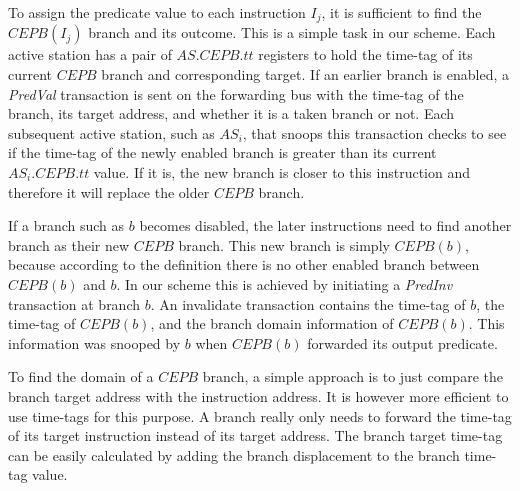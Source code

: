 \documentclass[10pt,twocolumn]{IEEEtran}
\begin{document}
To assign the predicate value to each instruction $I_j$, it is sufficient
to find the $CEPB(I_j)$ branch and its outcome.  This is a simple
task in our scheme.  Each active station has a pair of $AS.CEPB.tt$
registers to hold the time-tag of its current $CEPB$ branch and
corresponding target.  If an earlier branch is enabled, a
\emph{PredVal} transaction is sent on the forwarding bus with
the time-tag of the branch, its target address, and whether it is a taken
branch or not.  Each subsequent active station, such as $AS_i$,
that snoops this
transaction checks to see if the time-tag of the newly enabled
branch is greater than its current $AS_i.CEPB.tt$ value. 
If it is, the new
branch is closer to this instruction and therefore it will replace
the older $CEPB$ branch.

If a branch such as $b$ becomes disabled, the later instructions need
to find another branch as their new $CEPB$ branch.  This new branch 
is simply $CEPB(b)$, because according to the definition there is 
no other enabled
branch between $CEPB(b)$ and $b$. 
In
our scheme this is achieved by initiating a \emph{PredInv} transaction
at branch $b$.  An invalidate transaction contains the time-tag of
$b$, the time-tag of $CEPB(b)$, and the branch domain information of
$CEPB(b)$.  This information was snooped by $b$ when $CEPB(b)$
forwarded its output predicate.

To find the domain of a $CEPB$ branch, a simple approach is to just
compare the branch target address with the instruction address.
It is however more efficient to use time-tags for this purpose.
A branch really only needs to forward the time-tag of its target
instruction instead of its target address.  The branch target
time-tag can be easily calculated by adding the branch
displacement to the branch time-tag value.
\end{document}
